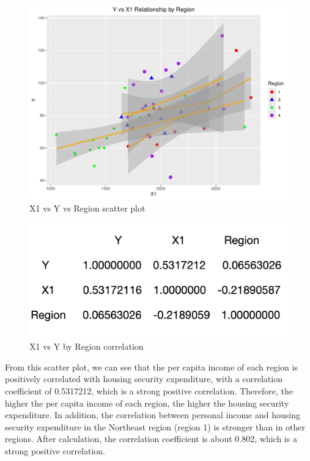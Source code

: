 \documentclass[12pt,letterpaper]{article}
\begin{document}
\begin{itemize}
\begin{figure}[h!]\centering
	\caption{\footnotesize X1 vs Y vs Region scatter plot}
	\label{fig:X1 vs Y_Region}
	\includegraphics[width=.75\textwidth]{X1vsY_Region_scatterplot.pdf}
\end{figure}
\begin{figure}[h!]\centering
	\caption{\footnotesize X1 vs Y by Region  correlation}
	\label{fig:corr_Y_X1_Region}
	\includegraphics[width=.75\textwidth]{corr_Y_X1_Region.png}
\end{figure}
	\vspace{5cm}
From this scatter plot, we can see that the per capita income of each region is positively correlated with housing security expenditure, with a correlation coefficient of 0.5317212, which is a strong positive correlation. Therefore, the higher the per capita income of each region, the higher the housing security expenditure. In addition, the correlation between personal income and housing security expenditure in the Northeast region (region 1) is stronger than in other regions. After calculation, the correlation coefficient is about 0.802, which is a strong positive correlation.\\
\end{itemize}
\end{document}
